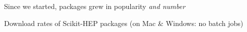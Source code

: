 \documentclass[aspectratio=169]{beamer}
\begin{document}
\begin{frame}{Since we started, packages grew in popularity {\it and number}}
\vspace{0.35 cm}

Download rates of Scikit-HEP packages (on Mac \& Windows: no batch jobs)

\end{frame}
\end{document}
